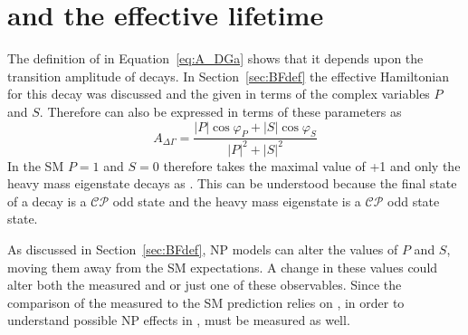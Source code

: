 \section[\ADG and the effective lifetime]{\boldmath{\ADG} and the effective lifetime}
\label{sec:ADG_EL}
The definition of \ADG in Equation~\ref{eq:A_DGa} shows that it depends upon the transition amplitude of \bsmumu decays. In Section~\ref{sec:BFdef} the effective Hamiltonian for this decay was discussed and the \BF given in terms of the complex variables $P$ and $S$. Therefore \ADG can also be expressed in terms of these parameters as~\cite{DeBruyn:2012wk}
\begin{equation}
A_{\Delta \Gamma} = \frac{|P|\cos \varphi_P + |S| \cos \varphi_S}{|P|^2 + |S|^2}
\label{eq:NP_ADG}
\end{equation}
In the SM $P=1$ and $S=0$ therefore \ADG takes the maximal value of +1 and only the heavy mass eigenstate decays as \bsmumu. This can be understood because the final state of a \bsmumu decay is a $\mathcal{CP}$ odd state and the heavy \bs mass eigenstate is a $\mathcal{CP}$ odd state state.

As discussed in Section~\ref{sec:BFdef}, NP models can alter the values of $P$ and $S$, moving them away from the SM expectations. A change in these values could alter both the measured \BF and \ADG or just one of these observables. Since the comparison of the measured \BF to the SM prediction relies on \ADG, in order to understand possible NP effects in \BF, \ADG must be measured as well. 

